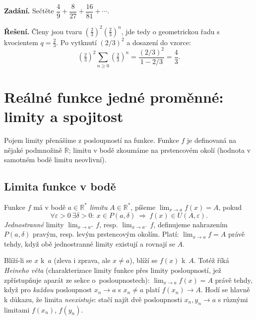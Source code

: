 \documentclass[11pt,a4paper]{article}
\begin{document}

\begin{priklad} \par
\textbf{Zadání.} Sečtěte $\dfrac{4}{9}+\dfrac{8}{27}+\dfrac{16}{81}+\cdots$.\par
\textbf{Řešení.} Členy jsou tvaru $\left(\tfrac23\right)^2\left(\tfrac23\right)^n$, jde tedy o geometrickou řadu s kvocientem $q=\tfrac23$. Po vytknutí $(2/3)^2$ a dosazení do vzorce:
\[
  \left(\tfrac23\right)^2\sum_{n\ge0}\left(\tfrac23\right)^n=\frac{(2/3)^2}{1-2/3}=\frac{4}{3}.
\]
\end{priklad}

\section{Reálné funkce jedné proměnné: limity a spojitost}

Pojem limity přenášíme z posloupností na funkce. Funkce $f$ je definovaná na nějaké podmnožině $\mathbb{R}$; limitu v bodě zkoumáme na prstencovém okolí (hodnota v samotném bodě limitu neovlivní).

\subsection{Limita funkce v bodě}

\begin{definice}
Funkce $f$ má v bodě $a\in\mathbb{R}^*$ \emph{limitu} $A\in\mathbb{R}^*$, píšeme $\lim_{x\to a}f(x)=A$, pokud
\[
  \forall\varepsilon>0\ \exists\delta>0:\ x\in P(a,\delta)\ \Rightarrow\ f(x)\in U(A,\varepsilon).
\]
\emph{Jednostranné} limity $\lim_{x\to a^+}f$, resp. $\lim_{x\to a^-}f$, definujeme nahrazením $P(a,\delta)$ pravým, resp. levým prstencovým okolím. Platí: $\lim_{x\to a}f=A$ právě tehdy, když obě jednostranné limity existují a rovnají se $A$.
\end{definice}

\begin{intuice}
Blíží-li se $x$ k~$a$ (zleva i zprava, ale $x\neq a$), blíží se $f(x)$ k~$A$. Totéž říká \emph{Heineho věta} (charakterizace limity funkce přes limity posloupností, jež zpřístupňuje aparát ze sekce o~posloupnostech): $\lim_{x\to a}f(x)=A$ právě tehdy, když pro \emph{každou} posloupnost $x_n\to a$ s $x_n\neq a$ platí $f(x_n)\to A$. Hodí se hlavně k důkazu, že limita \emph{neexistuje}: stačí najít dvě posloupnosti $x_n,y_n\to a$ s různými limitami $f(x_n)$, $f(y_n)$.
\end{intuice}
\end{document}
